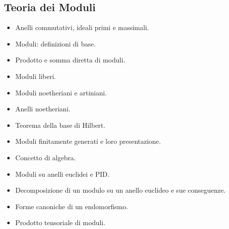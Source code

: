 \documentclass[a4paper,10pt]{article}
\begin{document}
\subsection*{Teoria dei Moduli}
\begin{itemize}
	\item Anelli commutativi, ideali primi e massimali. 
	\item Moduli: definizioni di base. 
	\item Prodotto e somma diretta di moduli. 
	\item Moduli liberi. 
	\item Moduli noetheriani e artiniani. 
	\item Anelli noetheriani. 
	\item Teorema della base di Hilbert. 
	\item Moduli finitamente generati e loro presentazione. 
	\item Concetto di algebra. 
	\item Moduli su anelli euclidei e PID. 
	\item Decomposizione di un modulo su un anello euclideo e sue conseguenze. 
	\item Forme canoniche di un endomorfismo. 
	\item Prodotto tensoriale di moduli.
\end{itemize}
\end{document}
